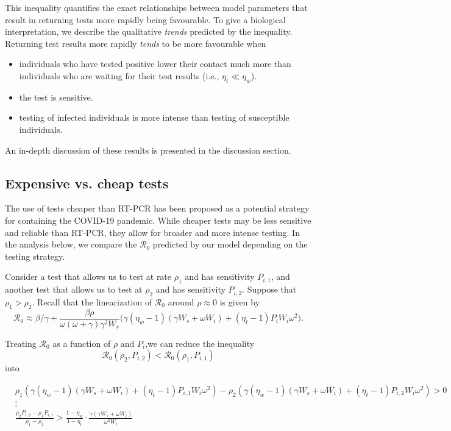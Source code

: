 \documentclass{article}
\newcommand{\Rnum}{\mathcal{R}_0}
\begin{document}
This inequality quantifies the exact relationships between model parameters that result in returning tests more rapidly being favourable. To give a biological interpretation, we describe the qualitative \textit{trends} predicted by the inequality. Returning test results more rapidly \textit{tends} to be more favourable when

\begin{itemize}
    \item individuals who have tested positive lower their contact much more than individuals who are waiting for their test results (i.e., $\eta_t \ll \eta_w$).
    \item the test is sensitive.
    \item testing of infected individuals is more intense than testing of susceptible individuals.
\end{itemize}
An in-depth discussion of these results is presented in the discussion section. 

\subsection{Expensive vs. cheap tests}

The use of tests cheaper than RT-PCR has been proposed as a potential strategy for containing the COVID-19 pandemic. While cheaper tests may be less sensitive and reliable than RT-PCR, they allow for broader and more intense testing. In the analysis below, we compare the $\Rnum$ predicted by our model depending on the testing strategy. 

Consider a test that allows us to test at rate $\rho_1$ and has sensitivity $P_{i,1}$, and another test that allows us to test at $\rho_2$ and has sensitivity $P_{i,2}$. Suppose that $\rho_1 > \rho_2$. Recall that the linearization of $\Rnum$ around $\rho \approx 0$ is given by $$\Rnum \approx \beta/\gamma + \frac{\beta \rho}{\omega (\omega+\gamma) \gamma^2 W_s} \Big(\gamma(\eta_w-1)(\gamma W_s+\omega W_i) + (\eta_t -1)P_iW_i \omega^2 \Big).$$


Treating $\Rnum$ as a function of $\rho$ and $P_i$,we can reduce the inequality $$\Rnum(\rho_2, P_{i,2}) < \Rnum(\rho_1, P_{i,1})$$ into 

\begin{align}\label{eq:rho1vsrho2}
    &\rho_1\left(\gamma(\eta_w-1)(\gamma W_s + \omega W_i) + (\eta_t-1)P_{i, 1}W_i\omega^2\right) - \rho_2\left(\gamma(\eta_w-1)(\gamma W_s + \omega W_i) + (\eta_t-1)P_{i, 2}W_i\omega^2\right) > 0 \nonumber \\
    &\vdots \nonumber \\
    &\frac{\rho_2P_{i, 2}-\rho_1P_{i, 1} }{\rho_1-\rho_2} > \frac{1-\eta_w}{1-\eta_t}\cdot \frac{\gamma(\gamma W_s + \omega W_i)}{\omega^2 W_i}
\end{align}
\end{document}
